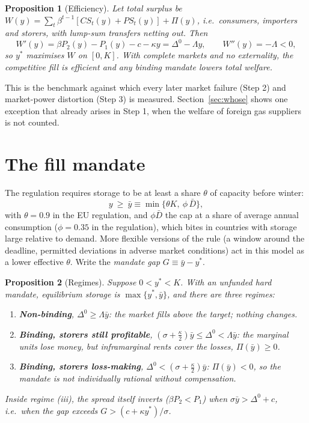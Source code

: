 \documentclass[11pt]{article}
\newtheorem{proposition}{Proposition}
\theoremstyle{definition}
\newcommand{\ybar}{\bar y}
\newcommand{\Dz}{\Delta^{0}}
\begin{document}
\begin{proposition}[Efficiency]\label{prop:eff}
Let total surplus be $W(y)=\sum_t\beta^{t-1}\left[CS_t(y)+PS_t(y)\right]+\Pi(y)$, i.e.\ consumers,
importers and storers, with lump-sum transfers netting out. Then
\begin{equation}
W'(y)=\beta P_2(y)-P_1(y)-c-\kappa y=\Dz-\Lambda y, \qquad W''(y)=-\Lambda<0,
\end{equation}
so $y^*$ maximises $W$ on $[0,K]$. With complete markets and no externality, the competitive fill is
efficient and any binding mandate lowers total welfare.
\end{proposition}

This is the benchmark against which every later market failure (Step 2) and market-power
distortion (Step 3) is measured. Section~\ref{sec:whose} shows one exception that already arises in
Step 1, when the welfare of foreign gas suppliers is not counted.

\section{The fill mandate}

The regulation requires storage to be at least a share $\theta$ of capacity before winter:
\begin{equation}
y \ \ge\ \ybar \equiv \min\{\theta K,\ \phi\,\bar D\},
\end{equation}
with $\theta=0.9$ in the EU regulation, and $\phi\bar D$ the cap at a share of average annual consumption
($\phi=0.35$ in the regulation), which bites in countries with storage large relative to demand. More
flexible versions of the rule (a window around the deadline, permitted deviations in adverse market
conditions) act in this model as a lower effective $\theta$. Write the \emph{mandate gap}
$G\equiv\ybar-y^*$.

\begin{proposition}[Regimes]\label{prop:regimes}
Suppose $0<y^*<K$. With an unfunded hard mandate, equilibrium storage is $\max\{y^*,\ybar\}$, and there are
three regimes:
\begin{enumerate}[label=(\roman*)]
\item \textbf{Non-binding}, $\Dz \ge \Lambda\ybar$: the market fills above the target; nothing changes.
\item \textbf{Binding, storers still profitable}, $(\sigma+\tfrac{\kappa}{2})\ybar \le \Dz < \Lambda\ybar$:
the marginal units lose money, but inframarginal rents cover the losses, $\Pi(\ybar)\ge 0$.
\item \textbf{Binding, storers loss-making}, $\Dz < (\sigma+\tfrac{\kappa}{2})\ybar$: $\Pi(\ybar)<0$, so the
mandate is not individually rational without compensation.
\end{enumerate}
Inside regime (iii), the spread itself inverts ($\beta P_2<P_1$) when $\sigma\ybar>\Dz+c$, i.e.\ when the gap
exceeds $G>(c+\kappa y^*)/\sigma$.
\end{proposition}
\end{document}
